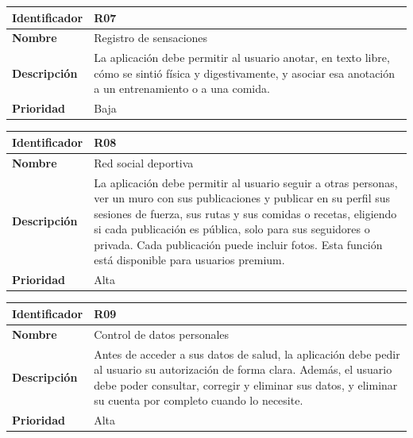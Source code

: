 \begin{table}[h!]
    \centering
    \renewcommand{\arraystretch}{1.3}
    \begin{tabular}{|p{3.5cm}|p{11.5cm}|}
        \hline
        \rowcolor[HTML]{EFEFEF} 
        \textbf{Identificador} & \textbf{R07} \\ \hline
        \textbf{Nombre} & Registro de sensaciones \\ \hline
        \textbf{Descripción} & La aplicación debe permitir al usuario anotar, en texto libre, cómo se sintió física y digestivamente, y asociar esa anotación a un entrenamiento o a una comida. \\ \hline
        \textbf{Prioridad} & Baja \\ \hline
    \end{tabular}
\end{table}
\newpage
\begin{table}[h!]
    \centering
    \renewcommand{\arraystretch}{1.3}
    \begin{tabular}{|p{3.5cm}|p{11.5cm}|}
        \hline
        \rowcolor[HTML]{EFEFEF} 
        \textbf{Identificador} & \textbf{R08} \\ \hline
        \textbf{Nombre} & Red social deportiva \\ \hline
        \textbf{Descripción} & La aplicación debe permitir al usuario seguir a otras personas, ver un muro con sus publicaciones y publicar en su perfil sus sesiones de fuerza, sus rutas y sus comidas o recetas, eligiendo si cada publicación es pública, solo para sus seguidores o privada. Cada publicación puede incluir fotos. Esta función está disponible para usuarios premium. \\ \hline
        \textbf{Prioridad} & Alta \\ \hline
    \end{tabular}
\end{table}

\begin{table}[h!]
    \centering
    \renewcommand{\arraystretch}{1.3}
    \begin{tabular}{|p{3.5cm}|p{11.5cm}|}
        \hline
        \rowcolor[HTML]{EFEFEF} 
        \textbf{Identificador} & \textbf{R09} \\ \hline
        \textbf{Nombre} & Control de datos personales \\ \hline
        \textbf{Descripción} & Antes de acceder a sus datos de salud, la aplicación debe pedir al usuario su autorización de forma clara. Además, el usuario debe poder consultar, corregir y eliminar sus datos, y eliminar su cuenta por completo cuando lo necesite. \\ \hline
        \textbf{Prioridad} & Alta \\ \hline
    \end{tabular}
\end{table}

